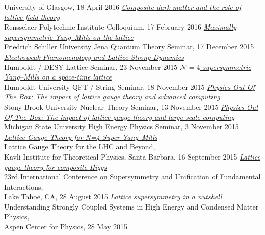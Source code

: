 \begin{spacelist}
\begin{revnumerate}
      University of Glasgow, 18 April 2016
    \pagebreakitem
      \textit{\href{http://www.davidschaich.net/talks/1602RPI.pdf}{Composite dark matter and the role of lattice field theory}} \\
      Rensselaer Polytechnic Institute Colloquium, 17 February 2016
    \pagebreakitem
      \textit{\href{http://www.davidschaich.net/talks/1512Jena.pdf}{Maximally supersymmetric Yang--Mills on the lattice}} \\
      Friedrich Schiller University Jena Quantum Theory Seminar, 17 December 2015
    \pagebreakitem
      \textit{\href{http://www.davidschaich.net/talks/151123Humboldt.pdf}{Electroweak Phenomenology and Lattice Strong Dynamics}} \\
      Humboldt / DESY Lattice Seminar, 23 November 2015
    \pagebreakitem
      \textit{\href{http://www.davidschaich.net/talks/151118Humboldt.pdf}{$\mathcal N = 4$ supersymmetric Yang--Mills on a space-time lattice}} \\
      Humboldt University QFT / String Seminar, 18 November 2015
    \pagebreakitem
      \textit{\href{http://www.davidschaich.net/talks/1511StonyBrook.pdf}{Physics Out Of The Box: The impact of lattice gauge theory and advanced computing}} \\
      Stony Brook University Nuclear Theory Seminar, 13 November 2015
    \pagebreakitem
      \textit{\href{http://www.davidschaich.net/talks/1511MSU.pdf}{Physics Out Of The Box: The impact of lattice gauge theory and large-scale computing}} \\
      Michigan State University High Energy Physics Seminar, 3 November 2015
    \pagebreakitem
      \textit{\href{http://www.davidschaich.net/talks/1509KITP.pdf}{Lattice Gauge Theory for N=4 Super Yang--Mills}} \\
      Lattice Gauge Theory for the LHC and Beyond, \\ Kavli Institute for Theoretical Physics, Santa Barbara, 16 September 2015
    \pagebreakitem
      \textit{\href{http://www.davidschaich.net/talks/LGT4CH.pdf}{Lattice gauge theory for composite Higgs}} \\
      23rd International Conference on Supersymmetry and Unification of Fundamental Interactions, \\ Lake Tahoe, CA, 28 August 2015
    \pagebreakitem
      \textit{\href{http://www.davidschaich.net/talks/Aspen15.pdf}{Lattice supersymmetry in a nutshell}} \\
      Understanding Strongly Coupled Systems in High Energy and Condensed Matter Physics, \\ Aspen Center for Physics, 28 May 2015

\end{revnumerate}
\end{spacelist}
